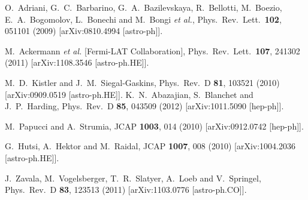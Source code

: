   O.~Adriani, G.~C.~Barbarino, G.~A.~Bazilevskaya, R.~Bellotti, M.~Boezio, E.~A.~Bogomolov, L.~Bonechi and M.~Bongi {\it et al.},
  Phys.\ Rev.\ Lett.\  {\bf 102}, 051101 (2009)
  [arXiv:0810.4994 [astro-ph]].

  M.~Ackermann {\it et al.}  [Fermi-LAT Collaboration],
  Phys.\ Rev.\ Lett.\  {\bf 107}, 241302 (2011)
  [arXiv:1108.3546 [astro-ph.HE]].

  M.~D.~Kistler and J.~M.~Siegal-Gaskins,
  Phys.\ Rev.\ D {\bf 81}, 103521 (2010)
  [arXiv:0909.0519 [astro-ph.HE]].
  K.~N.~Abazajian, S.~Blanchet and J.~P.~Harding,
  Phys.\ Rev.\ D {\bf 85}, 043509 (2012)
  [arXiv:1011.5090 [hep-ph]].


  M.~Papucci and A.~Strumia,
  JCAP {\bf 1003}, 014 (2010)
  [arXiv:0912.0742 [hep-ph]].

  G.~Hutsi, A.~Hektor and M.~Raidal,
  JCAP {\bf 1007}, 008 (2010)
  [arXiv:1004.2036 [astro-ph.HE]].

  J.~Zavala, M.~Vogelsberger, T.~R.~Slatyer, A.~Loeb and V.~Springel,
  Phys.\ Rev.\ D {\bf 83}, 123513 (2011)
  [arXiv:1103.0776 [astro-ph.CO]].


